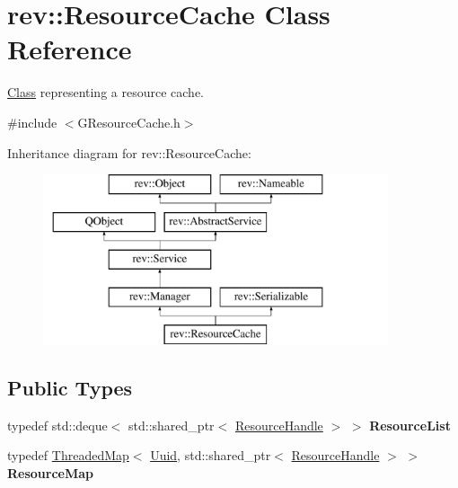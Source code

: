 \hypertarget{classrev_1_1_resource_cache}{}\section{rev\+::Resource\+Cache Class Reference}
\label{classrev_1_1_resource_cache}


\mbox{\hyperlink{struct_class}{Class}} representing a resource cache.  




{\ttfamily \#include $<$G\+Resource\+Cache.\+h$>$}

Inheritance diagram for rev\+::Resource\+Cache\+:\begin{figure}[H]
\begin{center}
\leavevmode
\includegraphics[height=5.000000cm]{classrev_1_1_resource_cache}
\end{center}
\end{figure}
\subsection*{Public Types}
\begin{DoxyCompactItemize}
\item 
\mbox{\label{classrev_1_1_resource_cache_a803d6de05e0ffd1be9f3e8cdc62b645a}} 
typedef std\+::deque$<$ std\+::shared\+\_\+ptr$<$ \mbox{\hyperlink{classrev_1_1_resource_handle}{Resource\+Handle}} $>$ $>$ {\bfseries Resource\+List}
\item 
\mbox{\label{classrev_1_1_resource_cache_a45e02c74189094fb33835e5cd9dc15fc}} 
typedef \mbox{\hyperlink{classrev_1_1_threaded_map}{Threaded\+Map}}$<$ \mbox{\hyperlink{classrev_1_1_uuid}{Uuid}}, std\+::shared\+\_\+ptr$<$ \mbox{\hyperlink{classrev_1_1_resource_handle}{Resource\+Handle}} $>$ $>$ {\bfseries Resource\+Map}
\end{DoxyCompactItemize}
